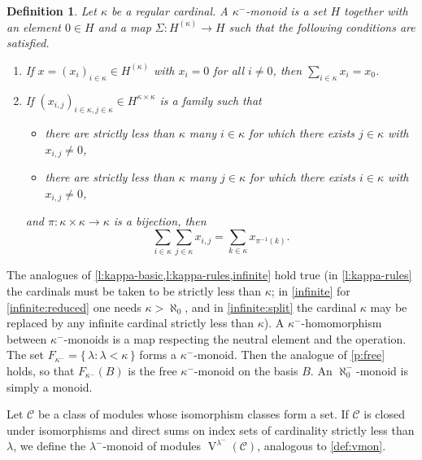 \documentclass[a4paper,11pt,oneside]{amsart}
\newtheorem{defi}[teor]{Definition}
\theoremstyle{remark}
\newcommand{\cC}{\mathcal C}
\DeclareMathOperator{\Vmon}{V}
\begin{document}
\begin{defi}
  Let $\kappa$ be a regular cardinal.
  A $\kappa^-$-monoid is a set $H$ together with an element $0 \in H$ and a map $\Sigma \colon H^{(\kappa)} \to H$ such that the following conditions are satisfied.
  \begin{enumerate}[label=\textup{(B\arabic*)},leftmargin=1.2cm]
  \item \label{b:trivial} If $x=(x_i)_{i \in \kappa} \in H^{(\kappa)}$ with $x_i=0$ for all $i \ne 0$, then $\sum_{i \in \kappa}x_i=x_0$.
  \item \label{b:flatten}
    If $(x_{i,j})_{i \in \kappa, j \in \kappa} \in H^{\kappa \times \kappa}$ is a family such that
    \begin{itemize}
    \item there are strictly less than $\kappa$ many $i \in \kappa$ for which there exists $j \in \kappa$ with $x_{i,j} \ne 0$,
    \item there are strictly less than $\kappa$ many $j \in \kappa$ for which there exists $i \in \kappa$ with $x_{i,j} \ne 0$, 
    \end{itemize}
    and $\pi \colon \kappa \times \kappa \to \kappa$ is a bijection, then
    \[
      {\sum_{i \in \kappa}} {\sum_{j \in \kappa}} x_{i,j} = {\sum_{k \in \kappa}} x_{\pi^{-1}(k)}.
    \]
  \end{enumerate}
\end{defi}

The analogues of \cref{l:kappa-basic,l:kappa-rules,infinite} hold true (in \cref{l:kappa-rules} the cardinals must be taken to be strictly less than $\kappa$; in \cref{infinite} for \ref{infinite:reduced} one needs $\kappa > \aleph_0$, and in \ref{infinite:split} the cardinal $\kappa$ may be replaced by any infinite cardinal strictly less than $\kappa$).
A $\kappa^-$-homomorphism between $\kappa^-$-monoids is a map respecting the neutral element and the operation.
The set $F_{\kappa^-} = \{\, \lambda : \lambda < \kappa \,\}$ forms a $\kappa^-$-monoid.
Then the analogue of \cref{p:free} holds, so that $F_{\kappa^-}(B)$ is the free $\kappa^-$-monoid on the basis $B$.
An $\aleph_0^-$-monoid is simply a monoid.

Let $\cC$ be a class of modules whose isomorphism classes form a set.
If $\cC$ is closed under isomorphisms and direct sums on index sets of cardinality strictly less than $\lambda$, we define the $\lambda^-$-monoid of modules $\Vmon^{\lambda^-}(\cC)$, analogous to \cref{def:vmon}.
\end{document}
